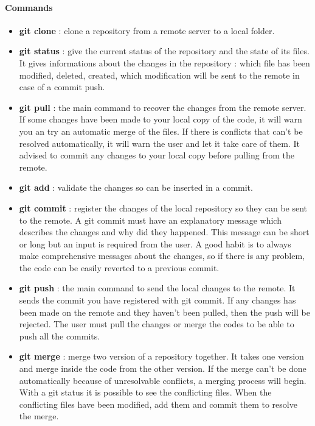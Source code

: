 \documentclass[a4paper]{report}
\begin{document}
\paragraph{Commands} 
\begin{itemize}
	\item \textbf{git clone} : clone a repository from a remote server to a local folder.
    \item \textbf{git status} : give the current status of the repository and the state of its files. It gives informations about the changes in the repository : which file has been modified, deleted, created, which modification will be sent to the remote in case of a commit push. 
    
    \item \textbf{git pull} : the main command to recover the changes from the remote server. If some changes have been made to your local copy of the code, it will warn you an try an automatic merge of the files. If there is conflicts that can't be resolved automatically, it will warn the user and let it take care of them. It advised to commit any changes to your local copy before pulling from the remote. 
    
    \item \textbf{git add} : validate the changes so can be inserted in a commit. 
    
    \item \textbf{git commit} : register the changes of the local repository so they can be sent to the remote. A git commit must have an explanatory message which describes the changes and why did they happened. This message can be short or long but an input is required from the user. A good habit is to always make comprehensive messages about the changes, so if there is any problem, the code can be easily reverted to a previous commit.
    
    \item \textbf{git push} : the main command to send the local changes to the remote. It sends the commit you have registered with git commit. If any changes has been made on the remote and they haven't been pulled, then the push will be rejected. The user must pull the changes or merge the codes to be able to push all the commits. 
    
    \item \textbf{git merge} : merge two version of a repository together. It takes one version and merge inside the code from the other version. If the merge can't be done automatically because of unresolvable conflicts, a merging process will begin. With a git status it is possible to see the conflicting files. When the conflicting files have been modified, add them and commit them to resolve the merge.   
    
\end{itemize}
\end{document}
